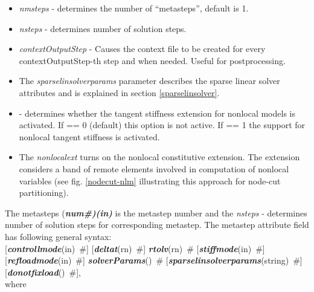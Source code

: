 \documentclass[draft]{article}
\newcommand{\param}[1]{{\em #1}}
\newcommand{\fieldVal}[2]{\mbox{({\it\bf{#1}\#)\tiny (#2)}}}
\newcommand{\keywordnotype}[1]{\mbox{{\it{\bf{#1}}}}}
\newcommand{\keyword}[2]{\mbox{{\keywordnotype{#1}\tiny (#2)}}}
\newcommand{\field}[2]{\mbox{\keyword{#1}{#2}~\#}}
\newcommand{\optField}[2]{\mbox{[\field{#1}{#2}]}}
\newcommand{\Pmode}[1]{{\sffamily #1}}
\begin{document}
\begin{itemize}
\item \param{nmsteps} - determines the number of
``metasteps'', default is 1.
\item \param{nsteps} - determines number of solution steps.
\item \param{contextOutputStep} - Causes the context file to be
created for every con\-text\-Out\-put\-Step-th step and when needed. Useful for
postprocessing.
\item The  \param{sparselinsolverparams} parameter describes the sparse
linear solver attributes and is explained in section \ref{sparselinsolver}.
\item \Pmode{\param{nonlocstiff} - determines whether the tangent stiffness
extension for nonlocal models is activated. If == 0 (default) this
option is not active. If == 1 the support for nonlocal tangent
stiffness is activated.}
\item \Pmode{The \param{nonlocalext} turns on the nonlocal constitutive
extension. The extension considers a band of remote elements involved
in computation of nonlocal variables (see fig. \ref{nodecut-nlm} illustrating
this approach for node-cut partitioning).
}

\end{itemize}
The metasteps \fieldVal{num}{in} is the metastep number and the
\param{nsteps} - determines number of solution steps for corresponding
metastep.
The metastep attribute field has following general syntax:\\
\optField{controllmode}{in} \optField{deltat}{rn}
\field{rtolv}{rn} \optField{stiffmode}{in}\\
\optField{refloadmode}{in} \field{solverParams}{}
\optField{sparselinsolverparams}{string}\\ \optField{donotfixload}{},\\
where 
\end{document}
